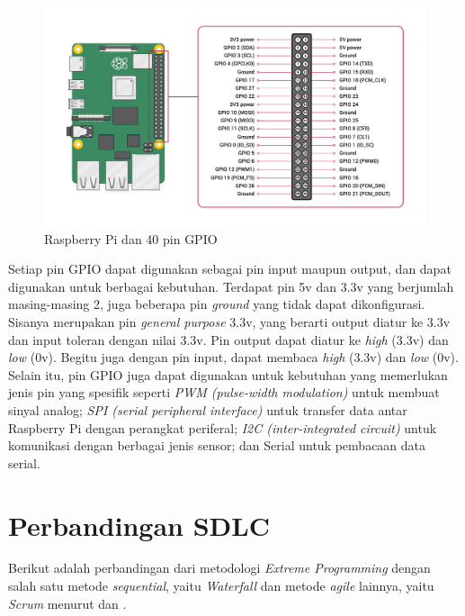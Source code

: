 \begin{figure}[!h]
    \includegraphics[width=1\linewidth, center]{images/tinjauan-pustaka/fig-raspy.png}
    \caption{Raspberry Pi dan 40 pin GPIO}
    \label{fig:raspy}
\end{figure}

Setiap pin GPIO dapat digunakan sebagai pin input maupun output, dan dapat digunakan untuk berbagai kebutuhan. Terdapat pin 5v dan 3.3v yang berjumlah masing-masing 2, juga beberapa pin \textit{ground} yang tidak dapat dikonfigurasi. Sisanya merupakan pin \textit{general purpose} 3.3v, yang berarti  output diatur ke 3.3v dan input toleran dengan nilai 3.3v. Pin output dapat diatur ke \textit{high} (3.3v) dan \textit{low} (0v). Begitu juga dengan pin input, dapat membaca \textit{high} (3.3v) dan \textit{low} (0v). Selain itu, pin GPIO juga dapat digunakan untuk kebutuhan yang memerlukan jenis pin yang spesifik seperti \textit{PWM (pulse-width modulation)} untuk membuat sinyal analog; \textit{SPI (serial peripheral interface)} untuk transfer data antar Raspberry Pi dengan perangkat periferal; \textit{I2C (inter-integrated circuit)} untuk komunikasi dengan berbagai jenis sensor; dan Serial untuk pembacaan data serial.

\section{Perbandingan SDLC}

Berikut adalah perbandingan dari metodologi \textit{Extreme Programming} dengan salah satu metode \textit{sequential}, yaitu \textit{Waterfall} dan metode \textit{agile} lainnya, yaitu \textit{Scrum} menurut \textcite{inproc:fahrurrozi} dan \textcite{article:suryantara}.

\newpage

